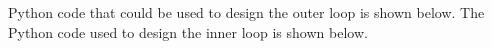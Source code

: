 Python code that could be used to design the outer loop is shown below.
The Python code used to design the inner loop is shown below.

%
%        
%        
%
%
%
%
%
%
